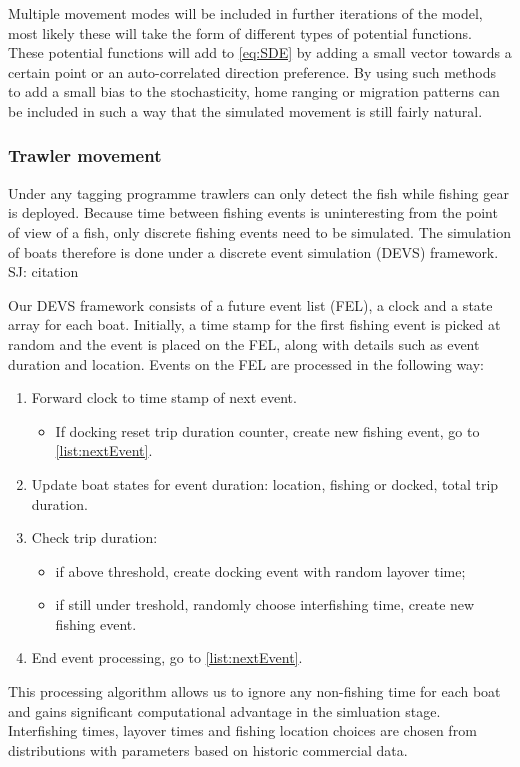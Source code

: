 \documentclass{article}
\newcommand{\sj}[1]{{\color{red}\mbox{}\marginpar{\raggedleft\hspace{0pt}*} SJ: #1}}
\begin{document}
Multiple movement modes will be included in further iterations of the model, most likely these will take the form of different types of potential functions. These potential functions will add to \eqref{eq:SDE} by adding a small vector towards a certain point or an auto-correlated direction preference. By using such methods to add a small bias to the stochasticity, home ranging or migration patterns can be included in such a way that the simulated movement is still fairly natural.

\subsubsection*{Trawler movement}

Under any tagging programme trawlers can only detect the fish while fishing gear is deployed. Because time between fishing events is uninteresting from the point of view of a fish, only discrete fishing events need to be simulated. The simulation of boats therefore is done under a discrete event simulation (DEVS) framework. \sj{citation}

Our DEVS framework consists of a future event list (FEL), a clock and a state array for each boat. Initially, a time stamp for the first fishing event is picked at random and the event is placed on the FEL, along with details such as event duration and location. Events on the FEL are processed in the following way:
\begin{enumerate}
  \item Forward clock to time stamp of next event. \label{list:nextEvent}
    \begin{itemize}
      \item If docking reset trip duration counter, create new fishing event, go to \ref{list:nextEvent}.
    \end{itemize}
  \item Update boat states for event duration: location, fishing or docked, total trip duration.
  \item Check trip duration:
  \begin{itemize}
    \item if above threshold, create docking event with random layover time;
    \item if still under treshold, randomly choose interfishing time, create new fishing event.
  \end{itemize}
  \item End event processing, go to \ref{list:nextEvent}.
\end{enumerate}
This processing algorithm allows us to ignore any non-fishing time for each boat and gains significant computational advantage in the simluation stage. Interfishing times, layover times and fishing location choices are chosen from distributions with parameters based on historic commercial data.
\end{document}
